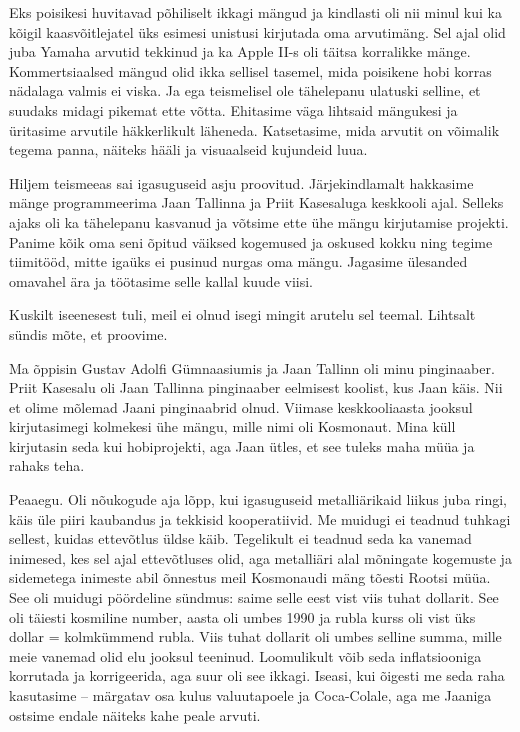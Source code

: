 
Eks poisikesi huvitavad põhiliselt ikkagi mängud ja kindlasti oli nii minul  
kui ka kõigil kaasvõitlejatel üks esimesi unistusi 
kirjutada oma arvutimäng. Sel ajal olid juba  
Yamaha arvutid tekkinud ja ka Apple II-s oli täitsa 
korralikke mänge. Kommertsiaalsed mängud olid ikka sellisel 
tasemel, mida poisikene hobi korras nädalaga valmis ei viska. Ja 
ega teismelisel ole tähelepanu ulatuski 
selline, et suudaks midagi pikemat ette võtta. Ehitasime väga 
lihtsaid mängukesi ja üritasime arvutile 
häkkerlikult läheneda. Katsetasime, mida arvutit on 
võimalik tegema panna, näiteks hääli ja visuaalseid kujundeid luua. 

Hiljem teismeeas sai igasuguseid asju proovitud. Järjekindlamalt 
hakkasime mänge programmeerima Jaan Tallinna ja Priit 
Kasesaluga keskkooli ajal. Selleks ajaks oli 
ka tähelepanu 
kasvanud ja võtsime ette ühe mängu kirjutamise projekti. Panime kõik oma seni 
õpitud väiksed kogemused 
ja oskused kokku ning tegime tiimitööd, mitte igaüks ei pusinud nurgas oma 
mängu. Jagasime 
ülesanded omavahel ära ja töötasime selle kallal kuude viisi. 


Kuskilt iseenesest tuli, meil ei olnud isegi
mingit arutelu sel teemal. Lihtsalt sündis mõte, et proovime. 


Ma õppisin Gustav Adolfi Gümnaasiumis
ja Jaan Tallinn oli minu pinginaaber. Priit 
Kasesalu oli Jaan Tallinna pinginaaber eelmisest 
koolist, kus Jaan käis. Nii et olime mõlemad Jaani pinginaabrid olnud. Viimase 
keskkooliaasta jooksul kirjutasimegi kolmekesi ühe mängu, 
mille nimi oli Kosmonaut. Mina küll  
kirjutasin seda kui hobiprojekti, aga Jaan ütles, et see tuleks maha müüa ja 
rahaks teha. 


Peaaegu. Oli nõukogude aja lõpp, kui igasuguseid 
metalliärikaid liikus juba ringi, käis üle piiri  
kaubandus ja tekkisid kooperatiivid. Me 
muidugi ei teadnud tuhkagi sellest, kuidas ettevõtlus 
üldse käib. Tegelikult ei teadnud seda ka vanemad inimesed, kes sel 
ajal ettevõtluses olid, aga metalliäri alal 
mõningate kogemuste ja 
sidemetega inimeste abil õnnestus meil Kosmonaudi mäng tõesti Rootsi müüa. 
See oli muidugi pöördeline sündmus: saime selle eest 
vist viis tuhat 
dollarit. See oli täiesti kosmiline number, aasta oli umbes 1990 ja rubla 
kurss oli vist üks dollar = kolmkümmend rubla. Viis tuhat dollarit 
oli umbes selline summa, mille meie vanemad olid elu jooksul teeninud. 
Loomulikult võib seda inflatsiooniga korrutada ja 
korrigeerida, aga suur oli see ikkagi. Iseasi, kui õigesti me seda raha 
kasutasime – märgatav osa kulus 
valuutapoele ja Coca-Colale, aga me Jaaniga ostsime endale näiteks kahe 
peale arvuti. 


